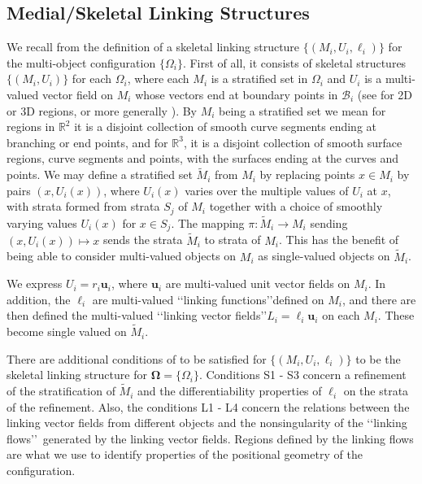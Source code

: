 \documentclass[10pt]{amsart}
\theoremstyle{definition}
\theoremstyle{definition}
\numberwithin{equation}{section}
\newcommand{\R}{{\mathbb R}}
\def \bu {\mathbf {u}}
\def \bgW {\boldsymbol \Omega}
\def \cB {\mathcal{B}}
\def \gW {\Omega}
\begin{document}
\subsection*{Medial/Skeletal Linking Structures}
\par
We recall from \cite{DG1} the definition of a skeletal linking  structure 
$\{(M_i, U_i, 
\ell_i)\}$ for the multi-object configuration $\{ \gW_i\}$.  First 
of all, it consists of skeletal structures $\{(M_i, U_i)\}$ for each 
$\gW_i$, where each $M_i$ is a stratified set in $\gW_i$ and $U_i$ is a 
multi-valued vector field on $M_i$ whose vectors end at boundary points 
in $\cB_i$ (see\cite{D3} for 2D or 3D regions, or more generally 
\cite{D2}).  By $M_i$ being a stratified set we mean for regions in $\R^2$ 
it is a disjoint collection of smooth curve segments ending at branching or 
end points, and for $\R^3$, it is a disjoint collection of smooth surface 
regions, curve segments and points, with the surfaces ending at the curves 
and points.  We may 
define a stratified set $\tilde M_i$ from $M_i$ by replacing points $x \in 
M_i$ by pairs $(x, U_i(x))$, where $U_i(x)$ varies over the multiple values 
of $U_i$ at $x$, with strata formed from strata $S_j$ of $M_i$ together 
with a choice of smoothly varying values $U_i(x)$ for $x \in S_j$.  The 
mapping $\pi : \tilde M_i \to M_i$ sending $(x, U_i(x)) \mapsto x$ sends 
the strata $\tilde M_i$ to strata of $M_i$.  This has the benefit of being 
able to consider multi-valued objects on $M_i$ as single-valued objects 
on $\tilde M_i$.  \par
We express $U_i = r_i\bu_i$, where $\bu_i$ are multi-valued unit vector 
fields on $M_i$.  In addition, the $\ell_i$ are multi-valued \lq\lq linking 
functions\rq\rq defined on $M_i$, and there are then defined the 
multi-valued \lq\lq linking vector fields\rq\rq  $L_i = \ell_i \bu_i$ on 
each $M_i$.  These become single valued on $\tilde M_i$.  \par 
There are additional conditions of \cite[Def. 3.2]{DG1} to be satisfied for 
$\{(M_i, U_i, \ell_i)\}$ to be the skeletal linking structure for $\bgW = \{ 
\gW_i\}$.  Conditions S1 - S3 concern a refinement of the stratification 
of $\tilde M_i$ and the differentiability properties of $\ell_i$ on the 
strata of the refinement.  Also, the conditions L1 - L4 concern the 
relations between the linking vector fields from different objects and the 
nonsingularity of the \lq\lq linking flows\rq\rq\, generated by the linking 
vector fields.  Regions defined by the linking flows are what we use to 
identify properties of the positional geometry of the configuration.  
\par
\end{document}
